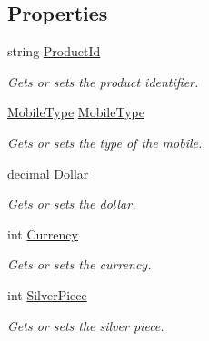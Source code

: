 \subsection*{Properties}
\begin{DoxyCompactItemize}
\item 
string \mbox{\hyperlink{class_t_net_1_1_pay_1_1_section_1_1_app_store_pay_element_a9e864fcc24d5add74987120d84deae8f}{Product\+Id}}
\begin{DoxyCompactList}\small\item\em Gets or sets the product identifier. \end{DoxyCompactList}\item 
\mbox{\hyperlink{namespace_t_net_1_1_service_a4153b2b37cffc4fde5d14a462ea83c7b}{Mobile\+Type}} \mbox{\hyperlink{class_t_net_1_1_pay_1_1_section_1_1_app_store_pay_element_a00d20d9ceb15372eef13bd2b240f54f4}{Mobile\+Type}}
\begin{DoxyCompactList}\small\item\em Gets or sets the type of the mobile. \end{DoxyCompactList}\item 
decimal \mbox{\hyperlink{class_t_net_1_1_pay_1_1_section_1_1_app_store_pay_element_ae5d1cc52fc1ff6b35d81f6c44e50e851}{Dollar}}
\begin{DoxyCompactList}\small\item\em Gets or sets the dollar. \end{DoxyCompactList}\item 
int \mbox{\hyperlink{class_t_net_1_1_pay_1_1_section_1_1_app_store_pay_element_a696666832b059355b08f39146e4fe66b}{Currency}}
\begin{DoxyCompactList}\small\item\em Gets or sets the currency. \end{DoxyCompactList}\item 
int \mbox{\hyperlink{class_t_net_1_1_pay_1_1_section_1_1_app_store_pay_element_ab80c5fa3fc52c94873e4ac0964268d13}{Silver\+Piece}}
\begin{DoxyCompactList}\small\item\em Gets or sets the silver piece. \end{DoxyCompactList}\end{DoxyCompactItemize}


